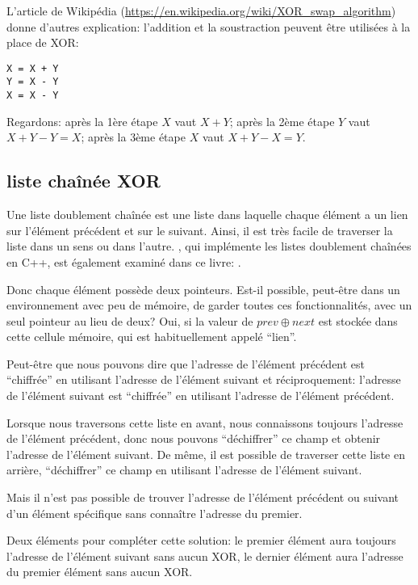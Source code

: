 L'article de Wikipédia (\url{https://en.wikipedia.org/wiki/XOR_swap_algorithm}) donne
d'autres explication: l'addition et la soustraction peuvent être utilisées à la place
de XOR:

\begin{lstlisting}
X = X + Y
Y = X - Y
X = X - Y
\end{lstlisting}

Regardons:
après la 1ère étape $X$ vaut $X+Y$;
après la 2ème étape $Y$ vaut $X+Y-Y=X$;
après la 3ème étape $X$ vaut $X+Y-X=Y$.

\subsection{liste chaînée XOR}

Une liste doublement chaînée est une liste dans laquelle chaque élément a un lien
sur l'élément précédent et sur le suivant.
Ainsi, il est très facile de traverser la liste dans un sens ou dans l'autre.
, qui implémente les listes doublement chaînées en C++, est également
examiné dans ce livre: .

Donc chaque élément possède deux pointeurs.
Est-il possible, peut-être dans un environnement avec peu de mémoire, de garder toutes
ces fonctionnalités, avec un seul pointeur au lieu de deux?
Oui, si la valeur de $prev \oplus next$ est stockée dans cette cellule mémoire, qui
est habituellement appelé ``lien''.

Peut-être que nous pouvons dire que l'adresse de l'élément précédent est ``chiffrée''
en utilisant l'adresse de l'élément suivant et réciproquement:
l'adresse de l'élément suivant est ``chiffrée'' en utilisant l'adresse de l'élément
précédent.

Lorsque nous traversons cette liste en avant, nous connaissons toujours l'adresse
de l'élément précédent, donc nous pouvons ``déchiffrer'' ce champ et obtenir l'adresse
de l'élément suivant.
De même, il est possible de traverser cette liste en arrière, ``déchiffrer'' ce champ
en utilisant l'adresse de l'élément suivant.

Mais il n'est pas possible de trouver l'adresse de l'élément précédent ou suivant
d'un élément spécifique sans connaître l'adresse du premier.

Deux éléments pour compléter cette solution: le premier élément aura toujours l'adresse
de l'élément suivant sans aucun XOR, le dernier élément aura l'adresse du premier
élément sans aucun XOR.

